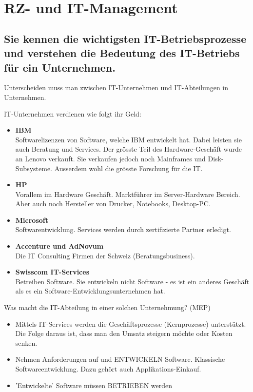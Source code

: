 \chapter{RZ- und IT-Management}

\section{Sie kennen die wichtigsten IT-Betriebsprozesse und
	verstehen die Bedeutung des IT-Betriebs für ein
	Unternehmen.}

Unterscheiden muss man zwischen IT-Unternehmen und IT-Abteilungen in Unternehmen.

IT-Unternehmen verdienen wie folgt ihr Geld:
\begin{itemize}
	\item \textbf{IBM}\\
	Softwarelizenzen von Software, welche IBM entwickelt hat. Dabei leisten sie auch Beratung und Services. Der grösste Teil
	des Hardware-Geschäft wurde an Lenovo verkauft. Sie verkaufen jedoch noch Mainframes und Disk-Subsysteme. Ausserdem
	wohl die grösste Forschung für die IT.
	\item \textbf{HP}\\
	Vorallem im Hardware Geschäft. Marktführer im Server-Hardware Bereich. Aber auch noch Hersteller von Drucker, Notebooks,
	Desktop-PC.
	\item \textbf{Microsoft}\\
	Softwarentwicklung. Services werden durch zertifizierte Partner erledigt.
	\item \textbf{Accenture und AdNovum}\\
	Die IT Consulting Firmen der Schweiz (Beratungsbusiness).
	\item \textbf{Swisscom IT-Services}\\
	Betreiben Software. Sie entwickeln nicht Software - es ist ein anderes Geschäft als es ein Software-Entwicklungsunternehmen hat.
\end{itemize}

Was macht die IT-Abteilung in einer solchen Unternehmung? (MEP)
\begin{itemize}
	\item Mittels IT-Services werden die Geschäftsprozesse (Kernprozesse) unterstützt. Die Folge daraus ist, dass man den Umsatz steigern möchte oder Kosten senken.
	\item Nehmen Anforderungen auf und ENTWICKELN Software. Klassische Softwareentwicklung. Dazu gehört auch Applikations-Einkauf.
	\item 'Entwickelte' Software müssen BETRIEBEN werden
\end{itemize}

